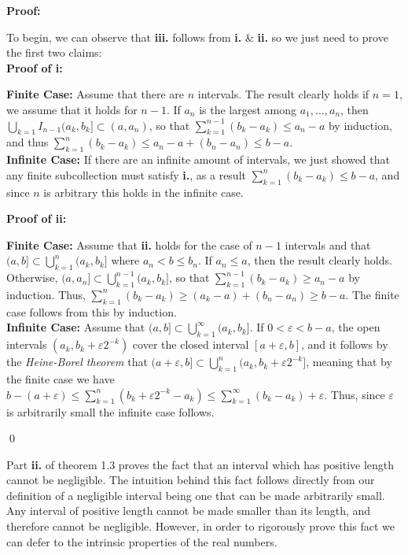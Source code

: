 \textbf{Proof:}
\begin{proofline}
	To begin, we can observe that \textbf{iii.} follows from \textbf{i.} \& \textbf{ii.} so we just need to prove the first two claims:\\
	{\footnotesize \textbf{Proof of i:}}
	\vspace{-1.5ex}
	\begin{proofline}
		{\footnotesize \textbf{Finite Case:}} Assume that there are $n$ intervals. The result clearly holds if $n=1$, we assume that it holds for $n-1$. If $a_n$ is the largest among $a_1,...,a_n$, then $\bigcup_{k=1} I_{n-1}(a_k, b_k] \subset (a, a_n)$, so that $\sum_{k=1}^{n-1}(b_k-a_k) \leq a_n -a $ by induction, and thus $\sum_{k=1}^{n}(b_k-a_k) \leq a_n -a + (b_n-a_n) \leq b-a$.\\[5pt]
		{\footnotesize \textbf{Infinite Case:}} If there are an infinite amount of intervals, we just showed that any finite subcollection must satisfy \textbf{i.}, as a result $\sum_{k=1}^{n}(b_k-a_k) \leq b-a$, and since $n$ is arbitrary this holds in the infinite case.
	\end{proofline}
	    
	{\footnotesize \textbf{Proof of ii:}}
	\vspace{-1.5ex}
	\begin{proofline}
		{\footnotesize \textbf{Finite Case:}} Assume that \textbf{ii.} holds for the case of $n-1$ intervals and that $(a,b] \subset \bigcup_{k=1}^n(a_k,b_k]$ where $a_n < b \leq b_n$. If $a_n \leq a$, then the result clearly holds. Otherwise, $(a,a_n] \subset \bigcup_{k=1}^{n-1}(a_k, b_k]$, so that $\sum_{k=1}^{n-1}(b_k-a_k) \geq a_n - a$ by induction. Thus, $\sum_{k=1}^n(b_k-a_k) \geq (a_k-a)+(b_n-a_n) \geq b-a$. The finite case follows from this by induction.\\[5pt]
		{\footnotesize \textbf{Infinite Case:}} Assume that  $(a,b] \subset \bigcup_{k=1}^{\infty}(a_k, b_k]$. If $0 < \varepsilon < b - a$, the open intervals $(a_k, b_k + \varepsilon2^{-k})$ cover the closed interval $[a + \varepsilon, b]$, and it follows by the \textit{Heine-Borel theorem} that $(a + \varepsilon, b] \subset \bigcup_{k=1}^n(a_k, b_k + \varepsilon2^{-k}]$, meaning that by the finite case we have $b - (a + \varepsilon) \leq \sum_{k=1}^n(b_k + \varepsilon 2^{-k}-a_k) \leq \sum_{k=1}^{\infty}(b_k-a_k) + \varepsilon$. Thus, since $\varepsilon$ is arbitrarily small the infinite case follows.
			\end{proofline}
			\vspace{-4ex}
			\hfill \qed
			\end{proofline}
			Part \textbf{ii.} of theorem 1.3 proves the fact that an interval which has  positive length cannot be negligible. The intuition behind this fact follows directly from our definition of a negligible interval being one that can be made arbitrarily small. Any interval of positive length cannot be made smaller than its length, and therefore cannot be negligible. However, in order to rigorously prove this fact we can defer to the intrinsic properties of the real numbers.
			
			
			
